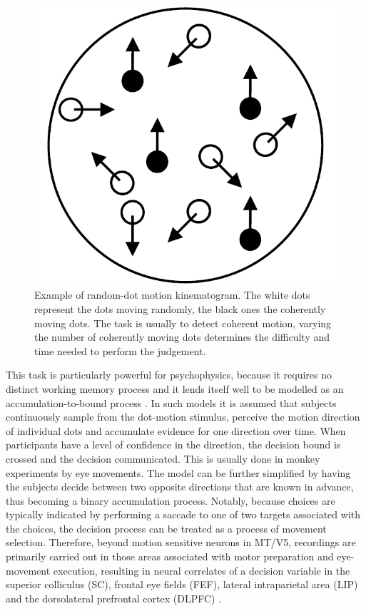 \begin{figure}[t]
\centering
\includegraphics[width=.3\textwidth]{figures/RDM_task.png}
\caption{Example of random-dot motion kinematogram. The white dots represent the dots moving randomly, the black ones the coherently moving dots. The task is usually to detect coherent motion, varying the number of coherently moving dots determines the difficulty and time needed to perform the judgement.}
\label{fig:RDMtask}
\end{figure}

This task is particularly powerful for psychophysics, because it requires no distinct working memory process and it lends itself well to be modelled as an accumulation-to-bound process \parencite{OConnell2018}. In such models it is assumed that subjects continuously sample from the dot-motion stimulus, perceive the motion direction of individual dots and accumulate evidence for one direction over time. When participants have a level of confidence in the direction, the decision bound is crossed and the decision communicated. This is usually done in monkey experiments by eye movements. The model can be further simplified by having the subjects decide between two opposite directions that are known in advance, thus becoming a binary accumulation process. Notably, because choices are typically indicated by performing a saccade to one of two targets associated with the choices, the decision process can be treated as a process of movement selection. Therefore, beyond motion sensitive neurons in MT/V5, recordings are primarily carried out in those areas associated with motor preparation and eye-movement execution, resulting in neural correlates of a decision variable in the superior colliculus (SC), frontal eye fields (FEF), lateral intraparietal area (LIP) and the dorsolateral prefrontal cortex (DLPFC) \parencite[for review see][]{Gold2007}. 

